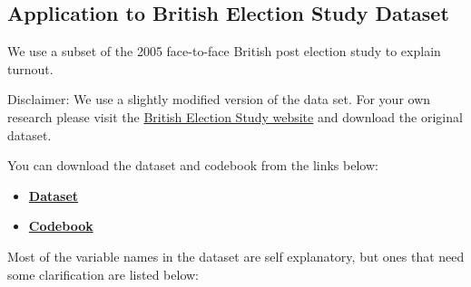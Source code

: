 \documentclass[]{article}
\providecommand{\tightlist}{%
  \setlength{\itemsep}{0pt}\setlength{\parskip}{0pt}}
\theoremstyle{definition}
\theoremstyle{definition}
\theoremstyle{remark}
\begin{document}
\subsection{Application to British Election Study
Dataset}\label{application-to-british-election-study-dataset}

We use a subset of the 2005 face-to-face British post election study to
explain turnout.

Disclaimer: We use a slightly modified version of the data set. For your
own research please visit the
\href{http://www.britishelectionstudy.com}{British Election Study
website} and download the original dataset.

You can download the dataset and codebook from the links below:

\begin{itemize}
\tightlist
\item
  \textbf{\href{http://uclspp.github.io/PUBLG100/data/bes.dta}{Dataset}}
\item
  \textbf{\href{http://uclspp.github.io/PUBLG100/data/bes_codebook.txt}{Codebook}}
\end{itemize}

Most of the variable names in the dataset are self explanatory, but ones
that need some clarification are listed below:
\end{document}
